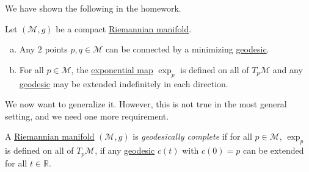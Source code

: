 We have shown the following in the homework.

\begin{theorem}
	Let \((\mathcal{M} , g)\) be a compact \hyperref[def:Riemannian-manifold]{Riemannian manifold}.
	\begin{enumerate}[(a)]
		\item Any \(2\) points \(p, q\in \mathcal{M} \) can be connected by a minimizing \hyperref[def:geodesic]{geodesic}.
		\item For all \(p\in \mathcal{M} \), the \hyperref[def:exponential-map]{exponential map} \(\exp _p\) is defined on all of \(T_p \mathcal{M} \) and any \hyperref[def:geodesic]{geodesic} may be extended indefinitely in each direction.
	\end{enumerate}
\end{theorem}

We now want to generalize it. However, this is not true in the most general setting, and we need one more requirement.

\begin{definition}\label{def:geodesically-complete}
	A \hyperref[def:Riemannian-manifold]{Riemannian manifold} \((\mathcal{M} , g)\) is \emph{geodesically complete} if for all \(p\in \mathcal{M} \), \(\exp _p\) is defined on all of \(T_p \mathcal{M} \), if any \hyperref[def:geodesic]{geodesic} \(c(t)\) with \(c(0) = p\) can be extended for all \(t\in \mathbb{R} \).
\end{definition}

